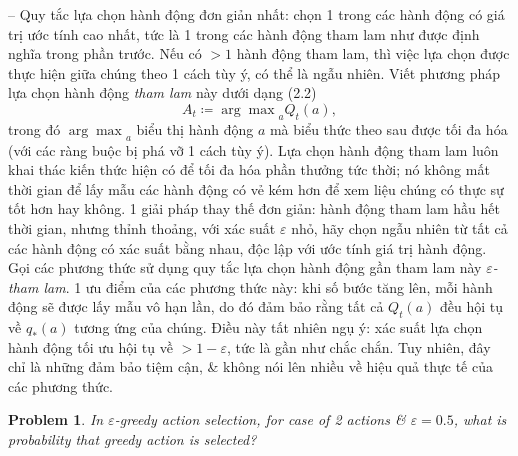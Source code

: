 \documentclass{article}
\newtheorem{problem}{Problem}
\begin{document}
\begin{itemize}
\begin{itemize}
        -- Quy tắc lựa chọn hành động đơn giản nhất: chọn 1 trong các hành động có giá trị ước tính cao nhất, tức là 1 trong các hành động tham lam như được định nghĩa trong phần trước. Nếu có $> 1$ hành động tham lam, thì việc lựa chọn được thực hiện giữa chúng theo 1 cách tùy ý, có thể là ngẫu nhiên. Viết phương pháp lựa chọn hành động {\it tham lam} này dưới dạng (2.2)
        \begin{equation*}
            A_t\coloneqq{\arg\max}_a Q_t(a),
        \end{equation*}
        trong đó ${\arg\max}_a$ biểu thị hành động $a$ mà biểu thức theo sau được tối đa hóa (với các ràng buộc bị phá vỡ 1 cách tùy ý). Lựa chọn hành động tham lam luôn khai thác kiến thức hiện có để tối đa hóa phần thưởng tức thời; nó không mất thời gian để lấy mẫu các hành động có vẻ kém hơn để xem liệu chúng có thực sự tốt hơn hay không. 1 giải pháp thay thế đơn giản: hành động tham lam hầu hết thời gian, nhưng thỉnh thoảng, với xác suất $\varepsilon$ nhỏ, hãy chọn ngẫu nhiên từ tất cả các hành động có xác suất bằng nhau, độc lập với ước tính giá trị hành động. Gọi các phương thức sử dụng quy tắc lựa chọn hành động gần tham lam này {\it$\varepsilon$-tham lam}. 1 ưu điểm của các phương thức này: khi số bước tăng lên, mỗi hành động sẽ được lấy mẫu vô hạn lần, do đó đảm bảo rằng tất cả $Q_t(a)$ đều hội tụ về $q_*(a)$ tương ứng của chúng. Điều này tất nhiên ngụ ý: xác suất lựa chọn hành động tối ưu hội tụ về $> 1 - \varepsilon$, tức là gần như chắc chắn. Tuy nhiên, đây chỉ là những đảm bảo tiệm cận, \& không nói lên nhiều về hiệu quả thực tế của các phương thức.

        \begin{problem}
            In $\varepsilon$-greedy action selection, for case of 2 actions \& $\varepsilon = 0.5$, what is probability that greedy action is selected?


\end{problem}
\end{itemize}
\end{itemize}
\end{document}
